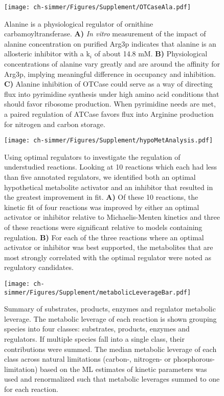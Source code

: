 \begin{figure}[H]
\texttt{[image: ch-simmer/Figures/Supplement/OTCaseAla.pdf]}
\caption[Alanine is a physiological regulator of ornithine carbamoyltransferase]{Alanine is a physiological regulator of ornithine carbamoyltransferase.  \textbf{A)} \textit{In vitro} measurement of the impact of alanine concentration on purified Arg3p indicates that alanine is an allosteric inhibitor with a k$_{i}$ of about 14.8 mM.  \textbf{B)} Physiological concentrations of alanine vary greatly and are around the affinity for Arg3p, implying meaningful difference in occupancy and inhibition.  \textbf{C)} Alanine inhibition of OTCase could serve as a way of directing flux into pyrimidine synthesis under high amino acid conditions that should favor ribosome production.  When pyrimidine needs are met, a paired regulation of ATCase favors flux into Arginine production for nitrogen and carbon storage.}
\label{fig:otcase}
\end{figure}

\begin{figure}[H]
\texttt{[image: ch-simmer/Figures/Supplement/hypoMetAnalysis.pdf]}
\caption[Using optimal regulators to investigate the regulation of understudied reactions]{Using optimal regulators to investigate the regulation of understudied reactions.  Looking at 10 reactions which each had less than five annotated regulators, we identified both an optimal hypothetical metabolite activator and an inhibitor that resulted in the greatest improvement in fit.  \textbf{A)} Of these 10 reactions, the kinetic fit of four reactions was improved by either an optimal activator or inhibitor relative to Michaelis-Menten kinetics and three of these reactions were significant relative to models containing regulation.  \textbf{B)} For each of the three reactions where an optimal activator or inhibitor was best supported, the metabolites that are most strongly correlated with the optimal regulator were noted as regulatory candidates.}
\label{fig:hypoMet}
\end{figure}

\begin{figure}[H]
\texttt{[image: ch-simmer/Figures/Supplement/metabolicLeverageBar.pdf]}
\caption[Summary of substrates, products, enzymes and regulator metabolic leverage]{Summary of substrates, products, enzymes and regulator metabolic leverage.  The metabolic leverage of each reaction is shown grouping species into four classes: substrates, products, enzymes and regulators. If multiple species fall into a single class, their contributions were summed. The median metabolic leverage of each class across natural limitations (carbon-, nitrogen- or phosphorous-limitation) based on the ML estimates of kinetic parameters was used and renormalized such that metabolic leverages summed to one for each reaction.}
\label{fig:MLbar}
\end{figure}

